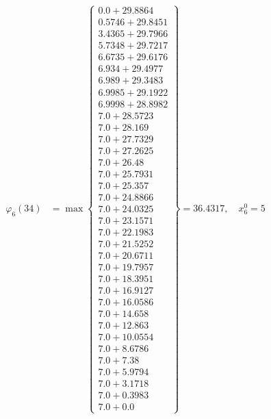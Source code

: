 \documentclass{article}
\begin{document}
\begin{align*}
\varphi_{6}(34) &= \max \left\{ \begin{array}{c}
0.0 + 29.8864 \\
 0.5746 + 29.8451 \\
 3.4365 + 29.7966 \\
 5.7348 + 29.7217 \\
 6.6735 + 29.6176 \\
 6.934 + 29.4977 \\
 6.989 + 29.3483 \\
 6.9985 + 29.1922 \\
 6.9998 + 28.8982 \\
 7.0 + 28.5723 \\
 7.0 + 28.169 \\
 7.0 + 27.7329 \\
 7.0 + 27.2625 \\
 7.0 + 26.48 \\
 7.0 + 25.7931 \\
 7.0 + 25.357 \\
 7.0 + 24.8866 \\
 7.0 + 24.0325 \\
 7.0 + 23.1571 \\
 7.0 + 22.1983 \\
 7.0 + 21.5252 \\
 7.0 + 20.6711 \\
 7.0 + 19.7957 \\
 7.0 + 18.3951 \\
 7.0 + 16.9127 \\
 7.0 + 16.0586 \\
 7.0 + 14.658 \\
 7.0 + 12.863 \\
 7.0 + 10.0554 \\
 7.0 + 8.6786 \\
 7.0 + 7.38 \\
 7.0 + 5.9794 \\
 7.0 + 3.1718 \\
 7.0 + 0.3983 \\
 7.0 + 0.0
\end{array} \right\}=36.4317, \quad x_{6}^0=5\\
  

\end{align*}
\end{document}
